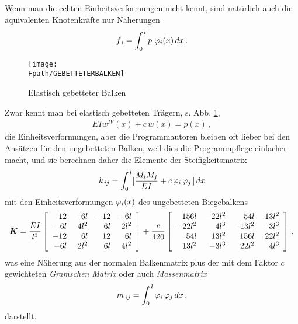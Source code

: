 Wenn man die echten Einheitsverformungen nicht kennt, sind nat\"{u}rlich auch die \"{a}quivalenten Knotenkr\"{a}fte nur N\"{a}herungen
\begin{align}
\tilde f_{\,i} = \int_0^{\,l} p \,\, \varphi_i(x)\, dx\,.
\end{align}
\begin{figure}[tbp] \centering
\if {} \sidecaption \fi
\texttt{[image: \\Fpath/GEBETTETERBALKEN]}
\caption{Elastisch gebetteter Balken}
\label{GebetteterBalken}%
\end{figure}%
Zwar kennt man bei elastisch gebetteten Tr\"{a}gern, s. Abb. \ref{GebetteterBalken},
\begin{align}\label{EGT}
EI w^{IV}(x) + c \,w(x) = p(x) \,,
\end{align}
die Einheitsverformungen, aber die Programmautoren bleiben oft lieber bei den Ans\"{a}tzen f\"{u}r den ungebetteten Balken, weil dies die Programmpflege einfacher macht, und sie berechnen daher die Elemente der Steifigkeitsmatrix
\begin{align}
k_{\,ij} = \int_0^{\,l} [\frac{M_i M_j}{EI } + c\, \varphi_i\, \varphi_j \,]\, dx
\end{align}
mit den Einheitsverformungen $\varphi_i(x)$ des ungebetteten Biegebalkens
\begin{align}\label{N1}
\tilde{\mbox{\boldmath $K$}} = \frac{EI}{l^3} \left[
\begin{array}{r r r r}
 12 & -6l & -12 &-6l \\
 -6l & 4l^2 & 6l &2l^2 \\
 -12 & 6l & 12 & 6l \\
 -6l &2l^2 &6l &4l^2
 \end{array}
  \right] + \frac{c}{420}
\left[ \begin{array}{r r r r}
 156l  & -22l^2  & 54l  &13 l^2  \\
 -22l^2 & 4l^3  & -13 l^2 &-3l^3  \\
 54l & 13 l^2 & 156l  & 22l^2  \\
 13 l^2 &-3l^3 &22l^2 &4l^3
 \end{array}  \right]\,,
\end{align}
was eine N\"{a}herung aus der normalen Balkenmatrix plus der mit dem Faktor $c$ gewichteten {\em Gramschen Matrix\/} oder auch {\em Massenmatrix} \begin{align}
m_{\,ij} = \int_0^{\,l} \varphi_i \,\varphi_j \,dx\,,
\end{align}
darstellt.

